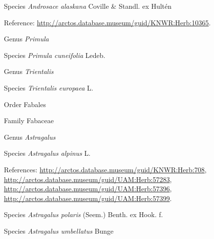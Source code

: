 \documentclass[9pt, article]{memoir}
\begin{document}
\begin{multicols}{2}
\vspace{6pt}\noindent\hspace{36pt}Species \textit{Androsace alaskana} Coville \& Standl. ex Hultén


\vspace{6pt}Reference: 
\url{http://arctos.database.museum/guid/KNWR:Herb:10365}.

\vspace{6pt}\noindent\hspace{30pt}Genus \textit{Primula}


\vspace{6pt}\noindent\hspace{36pt}Species \textit{Primula cuneifolia} Ledeb.


\vspace{6pt}\noindent\hspace{30pt}Genus \textit{Trientalis}


\vspace{6pt}\noindent\hspace{36pt}Species \textit{Trientalis europaea} L.


\vspace{6pt}\noindent\hspace{18pt}Order Fabales


\vspace{6pt}\noindent\hspace{24pt}Family Fabaceae


\vspace{6pt}\noindent\hspace{30pt}Genus \textit{Astragalus}


\vspace{6pt}\noindent\hspace{36pt}Species \textit{Astragalus alpinus} L.


\vspace{6pt}References: 
\url{http://arctos.database.museum/guid/KNWR:Herb:708}, 
\url{http://arctos.database.museum/guid/UAM:Herb:57283}, 
\url{http://arctos.database.museum/guid/UAM:Herb:57396}, 
\url{http://arctos.database.museum/guid/UAM:Herb:57399}.

\vspace{6pt}\noindent\hspace{36pt}Species \textit{Astragalus polaris} (Seem.) Benth. ex Hook. f.


\vspace{6pt}\noindent\hspace{36pt}Species \textit{Astragalus umbellatus} Bunge



\end{multicols}
\end{document}
